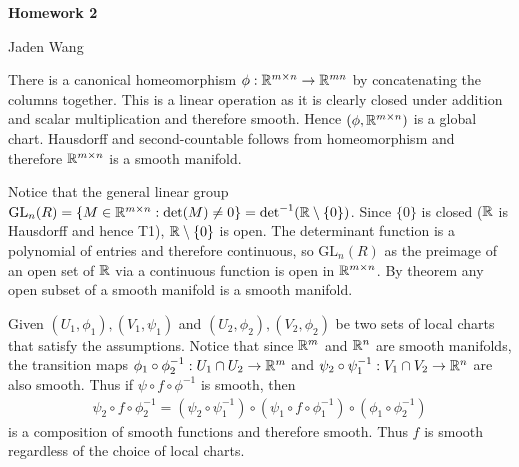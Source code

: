 \documentclass[12pt]{article}
\begin{document}
\centerline {\textsf{\textbf{\LARGE{Homework 2}}}}
\centerline {Jaden Wang}
\vspace{.15in}
\begin{problem}[4.4]
There is a canonical homeomorphism $ \phi: \mathbb{R}^{m \times n} \to \mathbb{R}^{mn}$ by concatenating the columns together. This is a linear operation as it is clearly closed under addition and scalar multiplication and therefore smooth. Hence $ (\phi, \mathbb{R}^{m \times n})$ is a global chart. Hausdorff and second-countable follows from homeomorphism and therefore $ \mathbb{R}^{m \times n}$ is a smooth manifold.

Notice that the general linear group $ \text{GL}_{ n}( R) = \{M \in \mathbb{R}^{m \times n} : \det (M) \neq 0\} = \det ^{-1}( \mathbb{R} \setminus \{0\}) $. Since $ \{0\} $ is closed ($ \mathbb{R}$ is Hausdorff and hence T1), $ \mathbb{R} \setminus \{0\} $ is open. The determinant function is a polynomial of entries and therefore continuous, so $ \text{GL}_{n}( R) $ as the preimage of an open set of $ \mathbb{R}$ via a continuous function is open in $ \mathbb{R}^{m \times n}$. By theorem any open subset of a smooth manifold is a smooth manifold.
\end{problem}

\begin{problem}[4.6]
Given $ (U_1,\phi_1),(V_1,\psi_1)$ and $ (U_2,\phi_2),(V_2,\phi_2)$ be two sets of local charts that satisfy the assumptions. Notice that since $ \mathbb{R}^{m}$ and $ \mathbb{R}^{n}$ are smooth manifolds, the transition maps $ \phi_1 \circ \phi_2 ^{-1}: U_1 \cap U_2 \to \mathbb{R}^{m}$ and $ \psi_2 \circ \psi_1 ^{-1} : V_1 \cap V_2 \to \mathbb{R}^{n}$ are also smooth. Thus if $\psi \circ  f \circ \phi ^{-1}$ is smooth, then
\begin{align*}
	\psi_2 \circ f \circ \phi_2 ^{-1} = (\psi_2 \circ \psi_1 ^{-1}) \circ (\psi_1 \circ f \circ \phi_1 ^{-1}) \circ (\phi_1 \circ \phi_2 ^{-1})
\end{align*}
is a composition of smooth functions and therefore smooth. Thus $ f$ is smooth regardless of the choice of local charts.
\end{problem}
\end{document}
